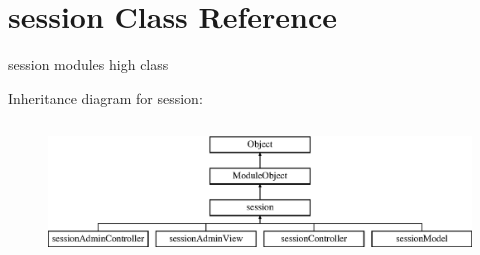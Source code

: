 \hypertarget{classsession}{}\section{session Class Reference}
\label{classsession}


session module\textquotesingle{}s high class  


Inheritance diagram for session\+:\begin{figure}[H]
\begin{center}
\leavevmode
\includegraphics[height=3.660131cm]{classsession}
\end{center}
\end{figure}

